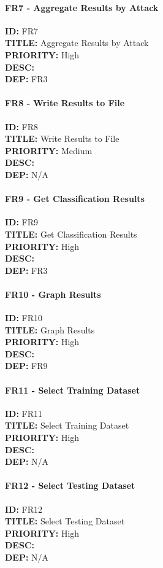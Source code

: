 \paragraph*{FR7 - Aggregate Results by Attack}
\textbf{ID:} FR7 \\
\textbf{TITLE:} Aggregate Results by Attack \\
\textbf{PRIORITY:} High \\
\textbf{DESC:}   \\
\textbf{DEP:} FR3
\paragraph*{FR8 - Write Results to File}
\textbf{ID:} FR8 \\
\textbf{TITLE:} Write Results to File \\
\textbf{PRIORITY:} Medium \\
\textbf{DESC:}   \\
\textbf{DEP:} N/A
\paragraph*{FR9 - Get Classification Results}
\textbf{ID:} FR9 \\
\textbf{TITLE:} Get Classification Results \\
\textbf{PRIORITY:} High \\
\textbf{DESC:}   \\
\textbf{DEP:} FR3
\paragraph*{FR10 - Graph Results}
\textbf{ID:} FR10 \\
\textbf{TITLE:} Graph Results \\
\textbf{PRIORITY:} High \\
\textbf{DESC:}   \\
\textbf{DEP:} FR9
\paragraph*{FR11 - Select Training Dataset}
\textbf{ID:} FR11 \\
\textbf{TITLE:} Select Training Dataset \\
\textbf{PRIORITY:} High \\
\textbf{DESC:}   \\
\textbf{DEP:} N/A
\paragraph*{FR12 - Select Testing Dataset}
\textbf{ID:} FR12 \\
\textbf{TITLE:} Select Testing Dataset \\
\textbf{PRIORITY:} High \\
\textbf{DESC:}   \\
\textbf{DEP:} N/A
